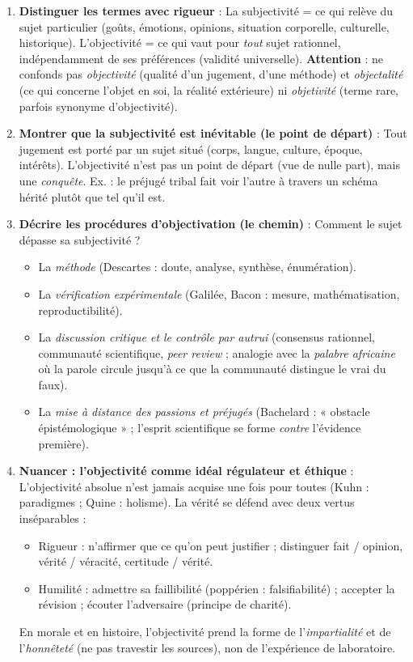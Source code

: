 \documentclass[11pt]{article}
\newcommand{\cle}[1]{{\popxbold\color{popdark}#1}}
\begin{document}
\begin{methode}
\begin{enumerate}
\item \textbf{Distinguer les termes avec rigueur} : La \cle{subjectivité} = ce qui relève du sujet particulier (goûts, émotions, opinions, situation corporelle, culturelle, historique). L'\cle{objectivité} = ce qui vaut pour \emph{tout} sujet rationnel, indépendamment de ses préférences (validité universelle). \textbf{Attention} : ne confonds pas \emph{objectivité} (qualité d'un jugement, d'une méthode) et \emph{objectalité} (ce qui concerne l'objet en soi, la réalité extérieure) ni \emph{objetivité} (terme rare, parfois synonyme d'objectivité).
\item \textbf{Montrer que la subjectivité est inévitable (le point de départ)} : Tout jugement est porté par un sujet situé (corps, langue, culture, époque, intérêts). L'objectivité n'est pas un point de départ (vue de nulle part), mais une \emph{conquête}. Ex. : le préjugé tribal fait voir l'autre à travers un schéma hérité plutôt que tel qu'il est.
\item \textbf{Décrire les procédures d'objectivation (le chemin)} : Comment le sujet dépasse sa subjectivité ?
\begin{itemize}
\item La \emph{méthode} (Descartes : doute, analyse, synthèse, énumération).
\item La \emph{vérification expérimentale} (Galilée, Bacon : mesure, mathématisation, reproductibilité).
\item La \emph{discussion critique et le contrôle par autrui} (consensus rationnel, communauté scientifique, \emph{peer review} ; analogie avec la \emph{palabre africaine} où la parole circule jusqu'à ce que la communauté distingue le vrai du faux).
\item La \emph{mise à distance des passions et préjugés} (Bachelard : « obstacle épistémologique » ; l'esprit scientifique se forme \emph{contre} l'évidence première).
\end{itemize}
\item \textbf{Nuancer : l'objectivité comme idéal régulateur et éthique} : L'objectivité absolue n'est jamais acquise une fois pour toutes (Kuhn : paradigmes ; Quine : holisme). La vérité se défend avec deux vertus inséparables :
\begin{itemize}
\item \cle{Rigueur} : n'affirmer que ce qu'on peut justifier ; distinguer fait / opinion, vérité / véracité, certitude / vérité.
\item \cle{Humilité} : admettre sa faillibilité (poppérien : falsifiabilité) ; accepter la révision ; écouter l'adversaire (principe de charité).
\end{itemize}
En morale et en histoire, l'objectivité prend la forme de l'\emph{impartialité} et de l'\emph{honnêteté} (ne pas travestir les sources), non de l'expérience de laboratoire.
\end{enumerate}
\end{methode}
\end{document}
